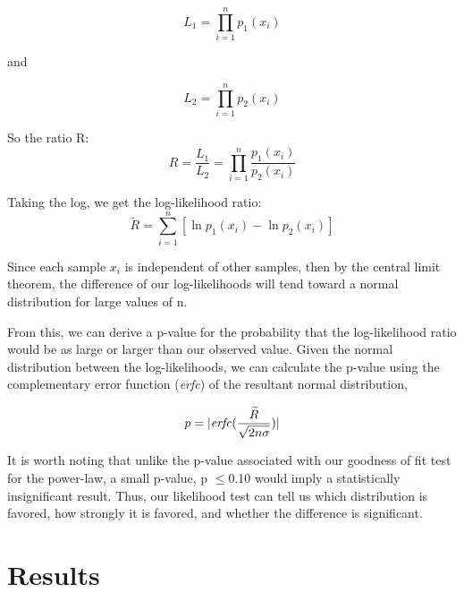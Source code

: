 \documentclass[12pt]{article}
\begin{document}
\begin{minipage}{0.25\linewidth}
\begin{equation*}
L_{1} = \prod_{i=1}^{n} p_{1}(x_{i})
\end{equation*}
\end{minipage}
\hspace{0.5cm}
and
\hspace{0.5cm}
\begin{minipage}{0.25\linewidth}
\begin{equation*}
L_{2} = \prod_{i=1}^{n} p_{2}(x_{i})
\end{equation*}
\end{minipage}

So the ratio R:
\begin{equation*}
R = \frac{L_{1}}{L_{2}} = \prod_{i=1}^{n}\frac{p_{1}(x_i)}{p_{2}(x_i)}
\end{equation*}

Taking the log, we get the log-likelihood ratio:
\begin{equation*}
\widetilde{R} = \sum_{i=1}^{n}\left[\ln p_{1}(x_i)-\ln p_{2}(x_i)\right]
\end{equation*}

Since each sample $x_{i}$ is independent of other samples, then by the central limit theorem, the difference of our log-likelihoods will tend toward a normal distribution for large values of n.

From this, we can derive a p-value for the probability that the log-likelihood ratio would be as large or larger than our observed value. Given the normal distribution between the log-likelihoods, we can calculate the p-value using the complementary error function (\emph{erfc}) of the resultant normal distribution, 

\begin{equation*}
p = |\textrm{\emph{erfc}}(\frac{\widetilde{R}}{\sqrt{2n\sigma}})|
\end{equation*}

It is worth noting that unlike the p-value associated with our goodness of fit test for the power-law, a small p-value, p $\leq$0.10 would imply a statistically insignificant result. Thus, our likelihood test can tell us which distribution is favored, how strongly it is favored, and whether the difference is significant.

\section{Results}
\end{document}

